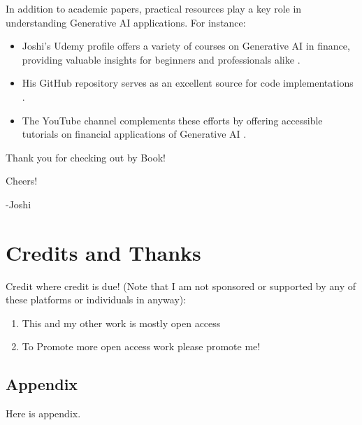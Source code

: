 \documentclass[a4paper,12pt]{scrbook}
\begin{document}
	
	In addition to academic papers, practical resources play a key role in understanding Generative AI applications. For instance:
	\begin{itemize}
		\item Joshi’s Udemy profile offers a variety of courses on Generative AI in finance, providing valuable insights for beginners and professionals alike \cite{JoshiUdemy2025}.
		\item His GitHub repository serves as an excellent source for code implementations \cite{JoshiGit2025}.
		\item The YouTube channel complements these efforts by offering accessible tutorials on financial applications of Generative AI \cite{JoshiYouTube2025}.
	\end{itemize}
	
	
	
	Thank you for checking out by Book!
	
	Cheers! \beers
	
	-Joshi
	
	\chapter*{Credits and Thanks}
	
	Credit where credit is due! (Note that I am not sponsored or supported by any of these platforms or individuals in anyway):
	
	\begin{enumerate}
		\item This and my other work is mostly open access
		\item To Promote more open access work please promote me!
		
	\end{enumerate}
	
	\begin{appendices}
		
		\chapter*{Appendix }
		
		Here is appendix.
		
		
		
	\end{appendices}
	
	\printindex
	
\end{document}
